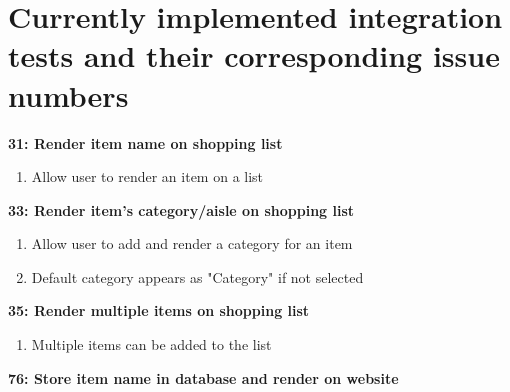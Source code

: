 \documentclass[10pt,onecolumn]{witseiepaper}
\begin{document}
\section{Currently implemented integration tests and their corresponding issue numbers}




\textbf{31: Render item name on shopping list}

\begin{enumerate}
	\item Allow user to render an item on a list
\end{enumerate}

\textbf{33: Render item's category/aisle on shopping list}

\begin{enumerate}
	\item Allow user to add and render a category for an item
	\item Default category appears as "Category" if not selected
\end{enumerate}

\textbf{35: Render multiple items on shopping list}

\begin{enumerate}
	\item Multiple items can be added to the list
\end{enumerate}

\textbf{76: Store item name in database and render on website}
\end{document}
